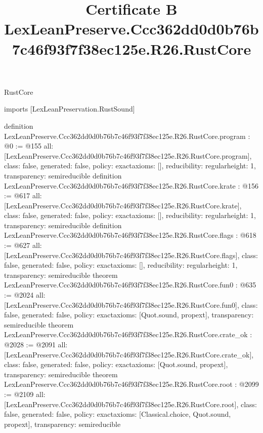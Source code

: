 \begin{lexlean}{RustCore}
\title{Certificate B LexLeanPreserve.Ccc362dd0d0b76b7c46f93f7f38ec125e.R26.RustCore}
\begin{coremodule}
imports [LexLeanPreservation.RustSound]

definition LexLeanPreserve.Ccc362dd0d0b76b7c46f93f7f38ec125e.R26.RustCore.program : @0 := @155 {
  all: [LexLeanPreserve.Ccc362dd0d0b76b7c46f93f7f38ec125e.R26.RustCore.program],
  class: false,
  generated: false,
  policy: exact{axioms: []},
  reducibility: regular{height: 1},
  transparency: semireducible
}
definition LexLeanPreserve.Ccc362dd0d0b76b7c46f93f7f38ec125e.R26.RustCore.krate : @156 := @617 {
  all: [LexLeanPreserve.Ccc362dd0d0b76b7c46f93f7f38ec125e.R26.RustCore.krate],
  class: false,
  generated: false,
  policy: exact{axioms: []},
  reducibility: regular{height: 1},
  transparency: semireducible
}
definition LexLeanPreserve.Ccc362dd0d0b76b7c46f93f7f38ec125e.R26.RustCore.flags : @618 := @627 {
  all: [LexLeanPreserve.Ccc362dd0d0b76b7c46f93f7f38ec125e.R26.RustCore.flags],
  class: false,
  generated: false,
  policy: exact{axioms: []},
  reducibility: regular{height: 1},
  transparency: semireducible
}
theorem LexLeanPreserve.Ccc362dd0d0b76b7c46f93f7f38ec125e.R26.RustCore.fun0 : @635 := @2024 {
  all: [LexLeanPreserve.Ccc362dd0d0b76b7c46f93f7f38ec125e.R26.RustCore.fun0],
  class: false,
  generated: false,
  policy: exact{axioms: [Quot.sound, propext]},
  transparency: semireducible
}
theorem LexLeanPreserve.Ccc362dd0d0b76b7c46f93f7f38ec125e.R26.RustCore.crate_ok : @2028 := @2091 {
  all: [LexLeanPreserve.Ccc362dd0d0b76b7c46f93f7f38ec125e.R26.RustCore.crate_ok],
  class: false,
  generated: false,
  policy: exact{axioms: [Quot.sound, propext]},
  transparency: semireducible
}
theorem LexLeanPreserve.Ccc362dd0d0b76b7c46f93f7f38ec125e.R26.RustCore.root : @2099 := @2109 {
  all: [LexLeanPreserve.Ccc362dd0d0b76b7c46f93f7f38ec125e.R26.RustCore.root],
  class: false,
  generated: false,
  policy: exact{axioms: [Classical.choice, Quot.sound, propext]},
  transparency: semireducible
}


\end{coremodule}
\end{lexlean}
